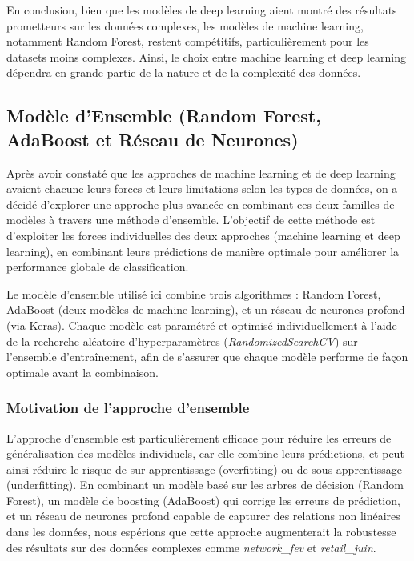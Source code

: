 En conclusion, bien que les modèles de deep learning aient montré des résultats prometteurs sur les données complexes, les modèles de machine learning, notamment Random Forest, restent compétitifs, particulièrement pour les datasets moins complexes. Ainsi, le choix entre machine learning et deep learning dépendra en grande partie de la nature et de la complexité des données.

\subsection{Modèle d’Ensemble (Random Forest, AdaBoost et Réseau de Neurones)}

Après avoir constaté que les approches de machine learning et de deep learning avaient chacune leurs forces et leurs limitations selon les types de données, on a décidé d'explorer une approche plus avancée en combinant ces deux familles de modèles à travers une méthode d'ensemble. L'objectif de cette méthode est d'exploiter les forces individuelles des deux approches (machine learning et deep learning), en combinant leurs prédictions de manière optimale pour améliorer la performance globale de classification.

Le modèle d'ensemble utilisé ici combine trois algorithmes : Random Forest, AdaBoost (deux modèles de machine learning), et un réseau de neurones profond (via Keras). Chaque modèle est paramétré et optimisé individuellement à l'aide de la recherche aléatoire d'hyperparamètres (\textit{RandomizedSearchCV}) sur l'ensemble d'entraînement, afin de s'assurer que chaque modèle performe de façon optimale avant la combinaison.

\subsubsection{Motivation de l’approche d’ensemble}

L'approche d'ensemble est particulièrement efficace pour réduire les erreurs de généralisation des modèles individuels, car elle combine leurs prédictions, et peut ainsi réduire le risque de sur-apprentissage (overfitting) ou de sous-apprentissage (underfitting). En combinant un modèle basé sur les arbres de décision (Random Forest), un modèle de boosting (AdaBoost) qui corrige les erreurs de prédiction, et un réseau de neurones profond capable de capturer des relations non linéaires dans les données, nous espérions que cette approche augmenterait la robustesse des résultats sur des données complexes comme \textit{network\_fev} et \textit{retail\_juin}.

